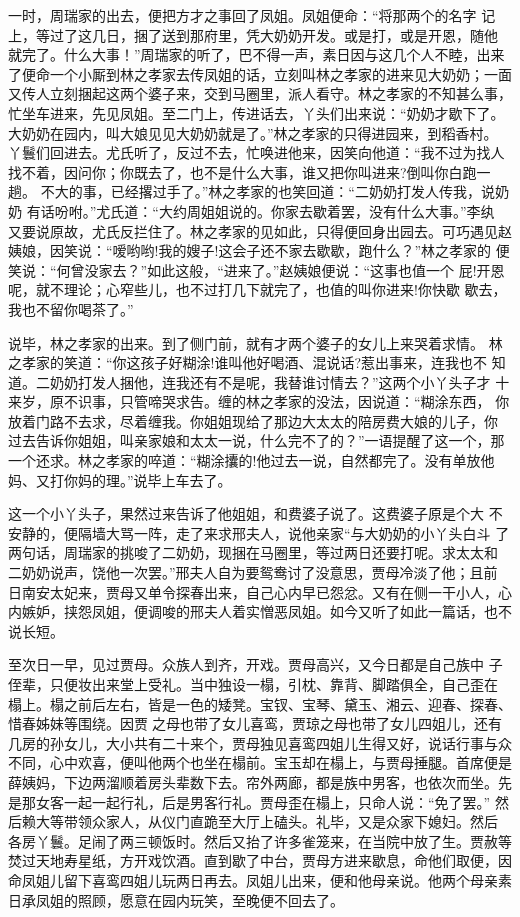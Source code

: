 一时，周瑞家的出去，便把方才之事回了凤姐。凤姐便命：“将那两个的名字
记上，等过了这几日，捆了送到那府里，凭大奶奶开发。或是打，或是开恩，随他
就完了。什么大事！”周瑞家的听了，巴不得一声，素日因与这几个人不睦，出来
了便命一个小厮到林之孝家去传凤姐的话，立刻叫林之孝家的进来见大奶奶；一面
又传人立刻捆起这两个婆子来，交到马圈里，派人看守。林之孝家的不知甚么事，
忙坐车进来，先见凤姐。至二门上，传进话去，丫头们出来说：“奶奶才歇下了。
大奶奶在园内，叫大娘见见大奶奶就是了。”林之孝家的只得进园来，到稻香村。
丫鬟们回进去。尤氏听了，反过不去，忙唤进他来，因笑向他道：“我不过为找人
找不着，因问你；你既去了，也不是什么大事，谁又把你叫进来?倒叫你白跑一趟。
不大的事，已经撂过手了。”林之孝家的也笑回道：“二奶奶打发人传我，说奶奶
有话吩咐。”尤氏道：“大约周姐姐说的。你家去歇着罢，没有什么大事。”李纨
又要说原故，尤氏反拦住了。林之孝家的见如此，只得便回身出园去。可巧遇见赵
姨娘，因笑说：“嗳哟哟!我的嫂子!这会子还不家去歇歇，跑什么？”林之孝家的
便笑说：“何曾没家去？”如此这般，“进来了。”赵姨娘便说：“这事也值一个
屁!开恩呢，就不理论；心窄些儿，也不过打几下就完了，也值的叫你进来!你快歇
歇去，我也不留你喝茶了。”

说毕，林之孝家的出来。到了侧门前，就有才两个婆子的女儿上来哭着求情。
林之孝家的笑道：“你这孩子好糊涂!谁叫他好喝酒、混说话?惹出事来，连我也不
知道。二奶奶打发人捆他，连我还有不是呢，我替谁讨情去？”这两个小丫头子才
十来岁，原不识事，只管啼哭求告。缠的林之孝家的没法，因说道：“糊涂东西，
你放着门路不去求，尽着缠我。你姐姐现给了那边大太太的陪房费大娘的儿子，你
过去告诉你姐姐，叫亲家娘和太太一说，什么完不了的？”一语提醒了这一个，那
一个还求。林之孝家的啐道：“糊涂攮的!他过去一说，自然都完了。没有单放他
妈、又打你妈的理。”说毕上车去了。

这一个小丫头子，果然过来告诉了他姐姐，和费婆子说了。这费婆子原是个大
不安静的，便隔墙大骂一阵，走了来求邢夫人，说他亲家“与大奶奶的小丫头白斗
了两句话，周瑞家的挑唆了二奶奶，现捆在马圈里，等过两日还要打呢。求太太和
二奶奶说声，饶他一次罢。”邢夫人自为要鸳鸯讨了没意思，贾母冷淡了他；且前
日南安太妃来，贾母又单令探春出来，自己心内早已怨忿。又有在侧一干小人，心
内嫉妒，挟怨凤姐，便调唆的邢夫人着实憎恶凤姐。如今又听了如此一篇话，也不
说长短。

至次日一早，见过贾母。众族人到齐，开戏。贾母高兴，又今日都是自己族中
子侄辈，只便妆出来堂上受礼。当中独设一榻，引枕、靠背、脚踏俱全，自己歪在
榻上。榻之前后左右，皆是一色的矮凳。宝钗、宝琴、黛玉、湘云、迎春、探春、
惜春姊妹等围绕。因贾之母也带了女儿喜鸾，贾琼之母也带了女儿四姐儿，还有
几房的孙女儿，大小共有二十来个，贾母独见喜鸾四姐儿生得又好，说话行事与众
不同，心中欢喜，便叫他两个也坐在榻前。宝玉却在榻上，与贾母捶腿。首席便是
薛姨妈，下边两溜顺着房头辈数下去。帘外两廊，都是族中男客，也依次而坐。先
是那女客一起一起行礼，后是男客行礼。贾母歪在榻上，只命人说：“免了罢。”
然后赖大等带领众家人，从仪门直跪至大厅上磕头。礼毕，又是众家下媳妇。然后
各房丫鬟。足闹了两三顿饭时。然后又抬了许多雀笼来，在当院中放了生。贾赦等
焚过天地寿星纸，方开戏饮酒。直到歇了中台，贾母方进来歇息，命他们取便，因
命凤姐儿留下喜鸾四姐儿玩两日再去。凤姐儿出来，便和他母亲说。他两个母亲素
日承凤姐的照顾，愿意在园内玩笑，至晚便不回去了。

